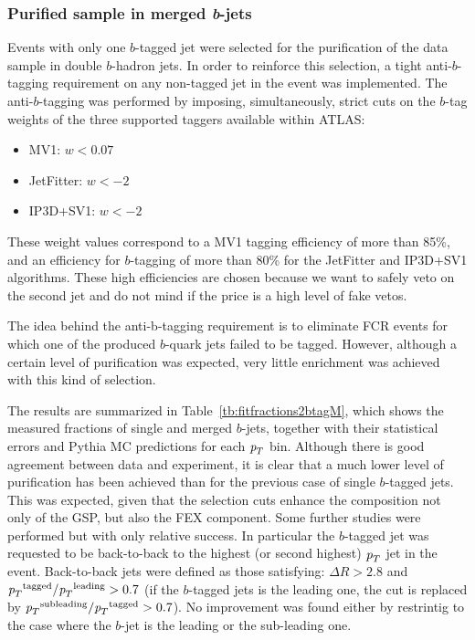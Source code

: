 \subsubsection{Purified sample in merged {\em b}-jets}

Events with only one $b$-tagged jet were selected for the purification of the data sample in double $b$-hadron jets.  In order to reinforce this selection, a tight anti-$b$-tagging requirement on any non-tagged jet in the event was implemented.  The anti-$b$-tagging was performed by imposing, simultaneously, strict cuts on the $b$-tag weights of the three supported taggers available within ATLAS:
%
\begin{itemize}
\item
MV1:  $w < 0.07$  
\item
JetFitter:  $w < -2$
\item
IP3D+SV1:  $w < -2$
\end{itemize}
%
These weight values correspond to a MV1 tagging efficiency of more than 85\%, and an efficiency for $b$-tagging of more than 80\% for the JetFitter and IP3D+SV1 algorithms. These high efficiencies are chosen because we want to safely veto on the second jet and do not mind if the price is a high level of fake vetos. %

The idea behind the anti-b-tagging requirement is to eliminate FCR events for which one of the produced $b$-quark jets failed to be tagged. However, although a certain level of purification was expected, very little enrichment was achieved with this kind of selection. %

The results are summarized in Table~\ref{tb:fitfractions2btagM}, which shows the measured fractions of single and merged $b$-jets, together with their statistical errors and {\sc Pythia} MC predictions for each ${\emph{p}_{T}}$ bin. Although there is good agreement between data and experiment, it is clear that a much lower level of purification has been achieved than for the previous case of single $b$-tagged jets. This was expected, given that the selection cuts enhance the composition not only of the GSP, but also the FEX component. 
Some further studies were performed but with only relative success. In particular the $b$-tagged jet was requested to be back-to-back to the highest (or second highest) ${\emph{p}_{T}}$ jet in the event.  Back-to-back jets were defined as those satisfying:  $\Delta R>2.8$ and  ${\emph{p}_{T}}^\text{tagged}/{\emph{p}_{T}}^\text{leading} > 0.7$  (if the $b$-tagged jets is the leading one, the cut is replaced by ${\emph{p}_{T}}^\text{subleading}/{\emph{p}_{T}}^\text{tagged} > 0.7$). No improvement was found either by restrintig to the case where the $b$-jet is the leading or the sub-leading one.

